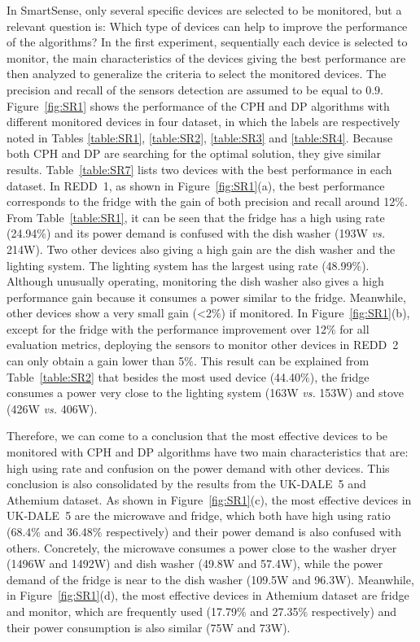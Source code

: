 In SmartSense, only several specific devices are selected to be monitored, but a relevant question is: Which type of devices can help to improve the performance of the algorithms? In the first experiment, sequentially each device is selected to monitor, the main characteristics of the devices giving the best performance are then analyzed to generalize the criteria to select the monitored devices. 
The precision and recall of the sensors detection are assumed to be equal to $0.9$. Figure~\ref{fig:SR1} shows the performance of the CPH and DP algorithms with different monitored devices in four dataset, in which the labels are respectively noted in Tables \ref{table:SR1}, \ref{table:SR2}, \ref{table:SR3} and \ref{table:SR4}. Because both CPH and DP are searching for the optimal solution, they give similar results.
Table~\ref{table:SR7} lists two devices with the best performance in each dataset. 
In REDD~1, as shown in Figure~\ref{fig:SR1}(a), the best performance corresponds to the fridge with the gain of both precision and recall around 12$\%$. From Table~\ref{table:SR1}, it can be seen that the fridge has a high using rate (24.94$\%$) and its power demand is confused with the dish washer (193W \emph{vs.} 214W). Two other devices also giving a high gain are the dish washer and the lighting system. The lighting system has the largest using rate (48.99$\%$). Although unusually operating, monitoring the dish washer also gives a high performance gain because it consumes a power similar to the fridge. Meanwhile, other devices show a very small gain (<2$\%$) if monitored.
In Figure~\ref{fig:SR1}(b), except for the fridge with the performance improvement over 12$\%$ for all evaluation metrics, deploying the sensors to monitor other devices in REDD~2 can only obtain a gain lower than 5$\%$. This result can be explained from Table~\ref{table:SR2} that besides the most used device (44.40$\%$), the fridge consumes a power very close to the lighting system (163W \emph{vs.} 153W) and stove (426W \emph{vs.} 406W). 
\par Therefore, we can come to a conclusion that the most effective devices to be monitored with CPH and DP algorithms have two main characteristics that are: high using rate and confusion on the power demand with other devices. This conclusion is also consolidated by the results from the UK-DALE~5 and Athemium dataset. As shown in Figure~\ref{fig:SR1}(c), the most effective devices in UK-DALE~5 are the microwave and fridge, which both have high using ratio (68.4$\%$ and 36.48$\%$ respectively) and their power demand is also confused with others. Concretely, the microwave consumes a power close to the washer dryer (1496W and 1492W) and dish washer (49.8W and 57.4W), while the power demand of the fridge is near to the dish washer (109.5W and 96.3W). Meanwhile, in Figure~\ref{fig:SR1}(d), the most effective devices in Athemium dataset are fridge and monitor, which are frequently used (17.79$\%$ and 27.35$\%$ respectively) and their power consumption is also similar (75W and 73W).

